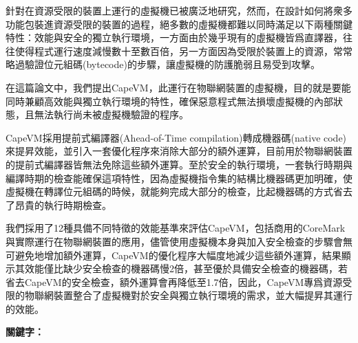 \begin{abstractzh}
針對在資源受限的裝置上運行的虛擬機已被廣泛地研究，然而，在設計如何將衆多功能包裝進資源受限的裝置的過程，絕多數的虛擬機都難以同時滿足以下兩種關鍵特性：效能與安全的獨立執行環境，一方面由於幾乎現有的虛擬機皆爲直譯器，往往使得程式運行速度減慢數十至數百倍，另一方面因為受限於裝置上的資源，常常略過驗證位元組碼(bytecode)的步驟，讓虛擬機的防護脆弱且易受到攻擊。

在這篇論文中，我們提出CapeVM，此運行在物聯網裝置的虛擬機，目的就是要能同時兼顧高效能與獨立執行環境的特性，確保惡意程式無法損壞虛擬機的內部狀態，且無法執行尚未被虛擬機驗證的程序。

CapeVM採用提前式編譯器(Ahead-of-Time compilation)轉成機器碼(native code)來提昇效能，並引入一套優化程序來消除大部分的額外運算，目前用於物聯網裝置的提前式編譯器皆無法免除這些額外運算。至於安全的執行環境，一套執行時期與編譯時期的檢查能確保這項特性，因為虛擬機指令集的結構比機器碼更加明確，使虛擬機在轉譯位元組碼的時候，就能夠完成大部分的檢查，比起機器碼的方式省去了昂貴的執行時期檢查。

我們採用了12種具備不同特徵的效能基準來評估CapeVM，包括商用的CoreMark與實際運行在物聯網裝置的應用，儘管使用虛擬機本身與加入安全檢查的步驟會無可避免地增加額外運算，CapeVM的優化程序大幅度地減少這些額外運算，結果顯示其效能僅比缺少安全檢查的機器碼慢2倍，甚至優於具備安全檢查的機器碼，若省去CapeVM的安全檢查，額外運算會再降低至1.7倍，因此，CapeVM專爲資源受限的物聯網裝置整合了虛擬機對於安全與獨立執行環境的需求，並大幅提昇其運行的效能。

\bigbreak
\noindent \textbf{關鍵字：}{\, \makeatletter \@keywordszh \makeatother}
\end{abstractzh}

